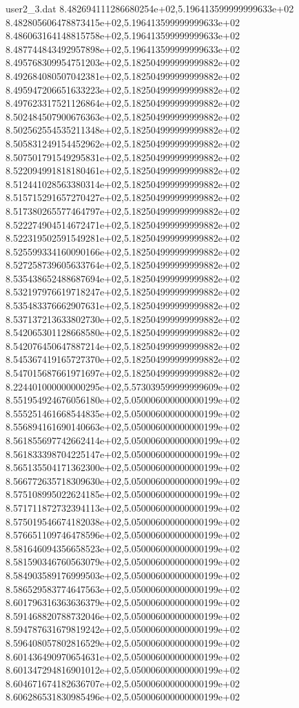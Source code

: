 \begin{filecontents}{user2_3.dat}
8.482694111286680254e+02,5.196413599999999633e+02
8.482805606478873415e+02,5.196413599999999633e+02
8.486063164148815758e+02,5.196413599999999633e+02
8.487744843492957898e+02,5.196413599999999633e+02
8.495768309954751203e+02,5.182504999999999882e+02
8.492684080507042381e+02,5.182504999999999882e+02
8.495947206651633223e+02,5.182504999999999882e+02
8.497623317521126864e+02,5.182504999999999882e+02
8.502484507900676363e+02,5.182504999999999882e+02
8.502562554535211348e+02,5.182504999999999882e+02
8.505831249154452962e+02,5.182504999999999882e+02
8.507501791549295831e+02,5.182504999999999882e+02
8.522094991818180461e+02,5.182504999999999882e+02
8.512441028563380314e+02,5.182504999999999882e+02
8.515715291657270427e+02,5.182504999999999882e+02
8.517380265577464797e+02,5.182504999999999882e+02
8.522274904514672471e+02,5.182504999999999882e+02
8.522319502591549281e+02,5.182504999999999882e+02
8.525599334160090166e+02,5.182504999999999882e+02
8.527258739605633764e+02,5.182504999999999882e+02
8.535438652488687694e+02,5.182504999999999882e+02
8.532197976619718247e+02,5.182504999999999882e+02
8.535483376662907631e+02,5.182504999999999882e+02
8.537137213633802730e+02,5.182504999999999882e+02
8.542065301128668580e+02,5.182504999999999882e+02
8.542076450647887214e+02,5.182504999999999882e+02
8.545367419165727370e+02,5.182504999999999882e+02
8.547015687661971697e+02,5.182504999999999882e+02
8.224401000000000295e+02,5.573039599999999609e+02
8.551954924676056180e+02,5.050006000000000199e+02
8.555251461668544835e+02,5.050006000000000199e+02
8.556894161690140663e+02,5.050006000000000199e+02
8.561855697742662414e+02,5.050006000000000199e+02
8.561833398704225147e+02,5.050006000000000199e+02
8.565135504171362300e+02,5.050006000000000199e+02
8.566772635718309630e+02,5.050006000000000199e+02
8.575108995022624185e+02,5.050006000000000199e+02
8.571711872732394113e+02,5.050006000000000199e+02
8.575019546674182038e+02,5.050006000000000199e+02
8.576651109746478596e+02,5.050006000000000199e+02
8.581646094356658523e+02,5.050006000000000199e+02
8.581590346760563079e+02,5.050006000000000199e+02
8.584903589176999503e+02,5.050006000000000199e+02
8.586529583774647563e+02,5.050006000000000199e+02
8.601796316363636379e+02,5.050006000000000199e+02
8.591468820788732046e+02,5.050006000000000199e+02
8.594787631679819242e+02,5.050006000000000199e+02
8.596408057802816529e+02,5.050006000000000199e+02
8.601436490970654631e+02,5.050006000000000199e+02
8.601347294816901012e+02,5.050006000000000199e+02
8.604671674182636707e+02,5.050006000000000199e+02
8.606286531830985496e+02,5.050006000000000199e+02

\end{filecontents}
